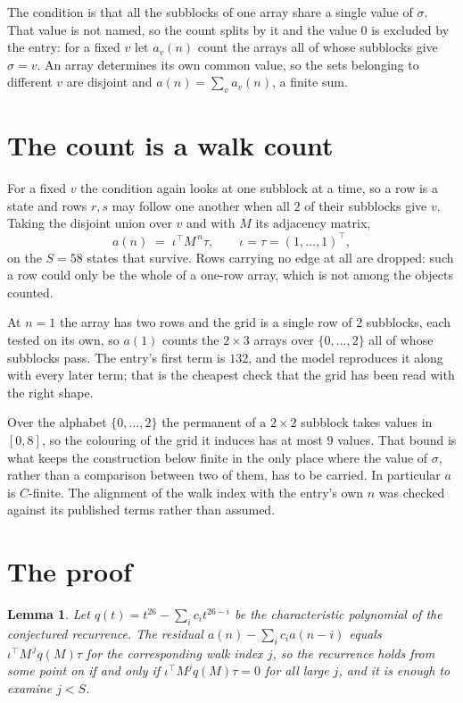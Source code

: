 \documentclass[11pt,a4paper]{article}
\theoremstyle{plain}
\newtheorem{lemma}[theorem]{Lemma}
\theoremstyle{definition}
\begin{document}
The condition is that all the subblocks of one array share a single value of $\sigma$. That
value is not named, so the count splits by it and the value $0$ is excluded by the entry: for a fixed $v$ let $a_v(n)$ count the
arrays all of whose subblocks give $\sigma=v$. An array determines its own common value, so
the sets belonging to different $v$ are disjoint and $a(n)=\sum_v a_v(n)$, a finite sum.

\section{The count is a walk count}

For a fixed $v$ the condition again looks at one subblock at a time, so a
row is a state and rows $r,s$ may follow one another when all $2$ of their subblocks give
$v$. Taking the disjoint union over $v$ and with $M$ its adjacency matrix,
\[
a(n)\;=\;\iota^{\!\top}M^{\,n}\tau,\qquad\iota=\tau=(1,\dots,1)^{\!\top},
\]
on the $S=58$ states that survive. Rows carrying no edge at all are dropped: such a row could
only be the whole of a one-row array, which is not among the objects counted.

At $n=1$ the array has two rows and the grid is a single row of $2$
subblocks, each tested on its own, so $a(1)$ counts the
$2\times3$ arrays over $\{0,\dots,2\}$ all of whose subblocks pass. The entry's
first term is $132$, and the model reproduces it along with every later term; that is the
cheapest check that the grid has been read with the right shape.

Over the alphabet $\{0,\dots,2\}$ the permanent of a $2\times2$ subblock takes values in
$[0,8]$, so the colouring of the grid it induces has at most $9$ values.
That bound is what keeps the construction below finite in the only place where the value of
$\sigma$, rather than a comparison between two of them, has to be carried.
In particular $a$ is $C$-finite. The alignment of the walk index with the entry's own $n$ was
checked against its published terms rather than assumed.

\section{The proof}

\begin{lemma}\label{lem:crit}
Let $q(t)=t^{26}-\sum_i c_it^{26-i}$ be the characteristic polynomial of the
conjectured recurrence. The residual $a(n)-\sum_ic_ia(n-i)$ equals
$\iota^{\!\top}M^{\,j}q(M)\tau$ for the corresponding walk index $j$, so the recurrence
holds from some point on if and only if $\iota^{\!\top}M^{j}q(M)\tau=0$ for all large $j$,
and it is enough to examine $j<S$.
\end{lemma}
\end{document}

